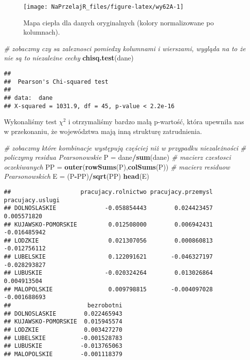 \documentclass[polish,]{book}
\newenvironment{Shaded}{\begin{snugshade}}{\end{snugshade}}
\newcommand{\CommentTok}[1]{\textcolor[rgb]{0.56,0.35,0.01}{\textit{#1}}}
\newcommand{\KeywordTok}[1]{\textcolor[rgb]{0.13,0.29,0.53}{\textbf{#1}}}
\newcommand{\NormalTok}[1]{#1}
\newcommand{\OperatorTok}[1]{\textcolor[rgb]{0.81,0.36,0.00}{\textbf{#1}}}
\newcommand{\StringTok}[1]{\textcolor[rgb]{0.31,0.60,0.02}{#1}}
\begin{document}
\begin{figure}[h]

{\centering \texttt{[image: NaPrzelajR\_files/figure-latex/wy62A-1]} 

}

\caption{Mapa ciepła dla danych oryginalnych (kolory normalizowane po kolumnach).}\label{fig:wy62A}
\end{figure}

\begin{Shaded}
\begin{Highlighting}[]
\CommentTok{# zobaczmy czy sa zaleznosci pomiedzy kolumnami i wierszami, wygląda na to że nie są to niezależne cechy}
\KeywordTok{chisq.test}\NormalTok{(dane)}
\end{Highlighting}
\end{Shaded}

\begin{verbatim}
## 
##  Pearson's Chi-squared test
## 
## data:  dane
## X-squared = 1031.9, df = 45, p-value < 2.2e-16
\end{verbatim}

Wykonaliśmy test \(\chi^2\) i otrzymaliśmy bardzo małą p-wartość, która upewniła nas w przekonaniu, że województwa mają inną strukturę zatrudnienia.

\begin{Shaded}
\begin{Highlighting}[]
\CommentTok{# zobaczmy które kombinacje występują częściej niż w przypadku niezależności}
\CommentTok{# policzymy residua Pearsonowskie}
\NormalTok{P =}\StringTok{ }\NormalTok{dane}\OperatorTok{/}\KeywordTok{sum}\NormalTok{(dane)}
\CommentTok{# macierz czestosci oczekiwanych}
\NormalTok{PP =}\StringTok{ }\KeywordTok{outer}\NormalTok{(}\KeywordTok{rowSums}\NormalTok{(P),}\KeywordTok{colSums}\NormalTok{(P))}
\CommentTok{# macierz residuow Pearsonowskich}
\NormalTok{E =}\StringTok{ }\NormalTok{(P}\OperatorTok{-}\NormalTok{PP)}\OperatorTok{/}\KeywordTok{sqrt}\NormalTok{(PP)}
\KeywordTok{head}\NormalTok{(E)}
\end{Highlighting}
\end{Shaded}

\begin{verbatim}
##                    pracujacy.rolnictwo pracujacy.przemysl pracujacy.uslugi
## DOLNOSLASKIE              -0.058854443        0.024423457      0.005571820
## KUJAWSKO-POMORSKIE         0.012508000        0.006942431     -0.016485942
## LODZKIE                    0.021307056        0.000860813     -0.012756112
## LUBELSKIE                  0.122091621       -0.046327197     -0.028293827
## LUBUSKIE                  -0.020324264        0.013026864      0.004913504
## MALOPOLSKIE                0.009798815       -0.004097028     -0.001688693
##                      bezrobotni
## DOLNOSLASKIE        0.022465943
## KUJAWSKO-POMORSKIE  0.015945574
## LODZKIE             0.003427270
## LUBELSKIE          -0.001528783
## LUBUSKIE           -0.013765063
## MALOPOLSKIE        -0.001118379
\end{verbatim}
\end{document}
